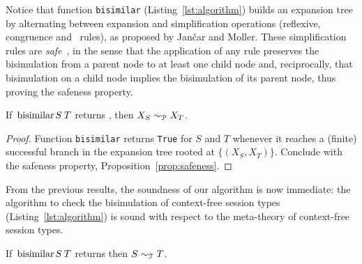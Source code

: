 Notice that function \lstinline|bisimilar|
(Listing~\ref{lst:algorithm}) builds an expansion tree by alternating
between expansion and simplification operations (reflexive,
congruence and \BPA\ rules), as proposed by Jan{\v{c}}ar and Moller.
%
These simplification rules are \emph{safe}~\cite{janvcar1999techniques}, in the sense that the
application of any rule preserves the bisimulation from a parent node
to at least one child node and, reciprocally, that bisimulation on a
child node implies the bisimulation of its parent node, thus proving
the safeness property.


\begin{lemma}
  \label{lem:bisimilar-to-prod}
  If $\bisimf S T$ returns , then
  $X_{S} \sim_\mathcal P X_{T}$.
\end{lemma}

\begin{proof}
  Function \lstinline|bisimilar| returns \lstinline|True| for $S$ and
  $T$ whenever it reaches a (finite) successful branch in the expansion
  tree rooted at $\{(X_{S}, X_{T})\}$. Conclude with the safeness property,
  Proposition~\ref{prop:safeness}.
\end{proof}

From the previous results, the soundness of our algorithm is now
immediate: the algorithm to check the bisimulation of context-free
session types (Listing~\ref{lst:algorithm}) is sound with respect to
the meta-theory of context-free session types.

\begin{theorem}
  If $\bisimf ST$ returns  then $S\sim_\mathcal T T$.
\end{theorem}

